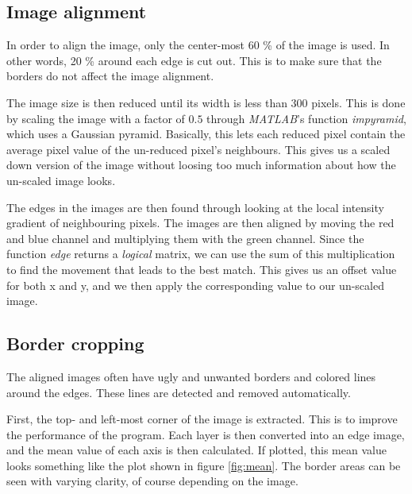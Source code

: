 \documentclass[12pt,a4paper]{article}
\begin{document}
  \subsection*{Image alignment}

    In order to align the image, only the center-most 60 \% of the image is used. In other words, 20 \% around each edge is cut out. This is to make sure that the borders do not affect the image alignment.

    The image size is then reduced until its width is less than 300 pixels. This is done by scaling the image with a factor of $0.5$ through \emph{MATLAB}'s function \emph{impyramid}, which uses a Gaussian pyramid. Basically, this lets each reduced pixel contain the average pixel value of the un-reduced pixel's neighbours. This gives us a scaled down version of the image without loosing too much information about how the un-scaled image looks.

    The edges in the images are then found through looking at the local intensity gradient of neighbouring pixels. The images are then aligned by moving the red and blue channel and multiplying them with the green channel. Since the function \emph{edge} returns a \emph{logical} matrix, we can use the sum of this multiplication to find the movement that leads to the best match. This gives us an offset value for both x and y, and we then apply the corresponding value to our un-scaled image.

  \subsection*{Border cropping}

    The aligned images often have ugly and unwanted borders and colored lines around the edges. These lines are detected and removed automatically.

    First, the top- and left-most corner of the image is extracted. This is to improve the performance of the program. Each layer is then converted into an edge image, and the mean value of each axis is then calculated. If plotted, this mean value looks something like the plot shown in figure \ref{fig:mean}. The border areas can be seen with varying clarity, of course depending on the image.
\end{document}
